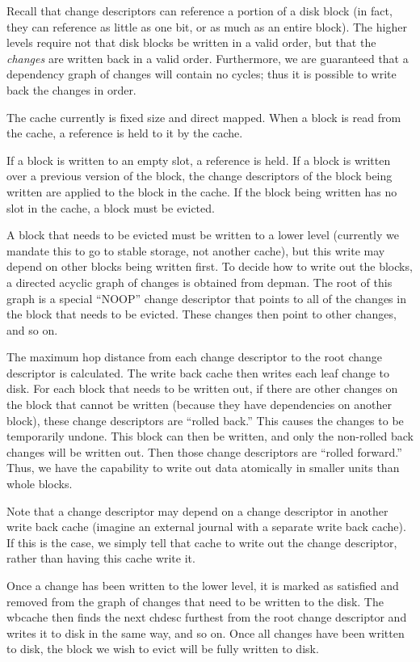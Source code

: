 Recall that change descriptors can reference a portion of a disk block (in fact,
they can reference as little as one bit, or as much as an entire block). The
higher levels require not that disk blocks be written in a valid order, but that
the \emph{changes} are written back in a valid order. Furthermore, we are
guaranteed that a dependency graph of changes will contain no cycles; thus it is
possible to write back the changes in order.

The cache currently is fixed size and direct mapped. When a block is read from
the cache, a reference is held to it by the cache.

If a block is written to an empty slot, a reference is held. If a block is
written over a previous version of the block, the change descriptors of the
block being written are applied to the block in the cache. If the block being
written has no slot in the cache, a block must be evicted.

A block that needs to be evicted must be written to a lower level (currently we
mandate this to go to stable storage, not another cache), but this write may
depend on other blocks being written first. To decide how to write out the
blocks, a directed acyclic graph of changes is obtained from depman. The root of
this graph is a special ``NOOP'' change descriptor that points to all of the
changes in the block that needs to be evicted. These changes then point to
other changes, and so on.

The maximum hop distance from each change descriptor to the root change
descriptor is calculated. The write back cache then writes each leaf change to
disk. For each block that needs to be written out, if there are other changes on
the block that cannot be written (because they have dependencies on another
block), these change descriptors are ``rolled back.'' This causes the changes to
be temporarily undone. This block can then be written, and only the non-rolled
back changes will be written out. Then those change descriptors are ``rolled
forward.'' Thus, we have the capability to write out data atomically in smaller
units than whole blocks.

Note that a change descriptor may depend on a change descriptor in another write
back cache (imagine an external journal with a separate write back cache). If
this is the case, we simply tell that cache to write out the change descriptor,
rather than having this cache write it.

Once a change has been written to the lower level, it is marked as satisfied and
removed from the graph of changes that need to be written to the disk. The
wbcache then finds the next chdesc furthest from the root change descriptor and
writes it to disk in the same way, and so on. Once all changes have been
written to disk, the block we wish to evict will be fully written to disk.

